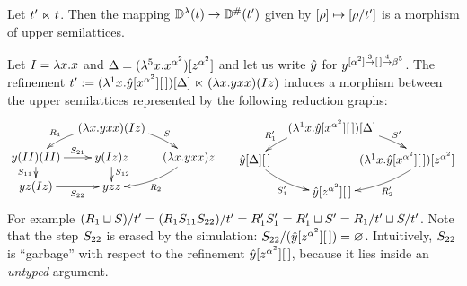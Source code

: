 \begin{corollary}
Let $t' \mathrel{\ltimes} t$.
Then the mapping $\mathbb{D}^{\lambda}(t) \to \mathbb{D}^{\mathtt{\#}}(t')$
given by ${[\rho]} \mapsto {[\rho/t']}$ is a morphism of upper
semilattices.
\end{corollary}

\begin{example}
Let $I = \lambda x. x$
and $\Delta = (\lambda^{5} x. x^{\alpha^2})[z^{\alpha^2}]$
and let us write $\hat{y}$ for $y^{[\alpha^2] \overset{3}{\to} [\,] \overset{4}{\to} \beta^5}$.
The refinement $t' := (\lambda^{1} x. \hat{y}[x^{\alpha^2}][\,])[\Delta] \mathrel{\ltimes} (\lambda x. yxx)(Iz)$
induces a morphism between the upper semilattices represented by the following reduction graphs:
\[
  \xymatrix@R=.3cm@C=.3cm{
  &
    (\lam{\var}{\vartwo\var\var})(I\varthree)
    \ar@/_.25cm/[dl]_-{\redex_1}
    \ar@/^.25cm/[dr]^-{\redextwo}
  &
  &
  \\
    \vartwo(II)(II)
    \ar[d]_-{\redextwo_{11}}
    \ar[r]^-{\redextwo_{21}}
  &
    \vartwo(I\varthree)\varthree
    \ar[d]^{\redextwo_{12}}
  &
    (\lam{\var}{\vartwo\var\var})\varthree
    \ar@/^.25cm/[dl]^-{\redex_2}
  \\
    \vartwo \varthree (I\varthree)
    \ar[r]_-{\redextwo_{22}}
  &
    \vartwo \varthree \varthree
  }
  \xymatrix@R=.3cm@C=.3cm{
  &
    (\lamp{1}{\var}{\hat{\vartwo}[\var^{\alpha^2}][\,]})[\Delta]
    \ar@/_.25cm/[dl]_-{\redex'_1}
    \ar@/^.25cm/[dr]^-{\redextwo'}
  \\
    \hat{\vartwo}[\Delta][\,]
    \ar@/_.25cm/[dr]_-{\redextwo'_1}
  &
  &
    \hspace{-1cm}(\lamp{1}{\var}{\hat{\vartwo}[\var^{\alpha^2}][\,]})[\varthree^{\alpha^2}]
    \ar@/^.25cm/[dl]^-{\redex'_2}
  \\
  &
    \hat{\vartwo}[\varthree^{\alpha^2}][\,]
  }
\]
For example
$(R_1 \sqcup S)/t' = (R_1S_{11}S_{22})/t' = R'_1S'_1 = R'_1 \sqcup S' = R_1/t' \sqcup S/t'$.
Note that the step $S_{22}$ is erased by the simulation: $S_{22}/(\hat{y}[z^{\alpha^2}][\,]) = \varnothing$.
Intuitively, $S_{22}$ is ``garbage'' with respect to the refinement $\hat{y}[z^{\alpha^2}][\,]$,
because it lies inside an {\em untyped} argument.
\end{example}

